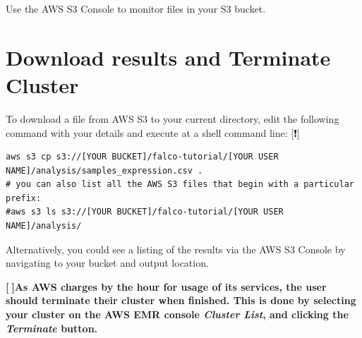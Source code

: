 \documentclass[
]{book}
\begin{document}
Use the AWS S3 Console to monitor files in your S3 bucket.

\hypertarget{download-results-and-terminate-cluster}{%
\section{Download results and Terminate Cluster}\label{download-results-and-terminate-cluster}}

To download a file from AWS S3 to your current directory, edit the following command with your details and execute at a shell command line: {[}❗️{]}

\begin{verbatim}
aws s3 cp s3://[YOUR BUCKET]/falco-tutorial/[YOUR USER NAME]/analysis/samples_expression.csv .
# you can also list all the AWS S3 files that begin with a particular prefix:
#aws s3 ls s3://[YOUR BUCKET]/falco-tutorial/[YOUR USER NAME]/analysis/
\end{verbatim}

Alternatively, you could see a listing of the results via the AWS S3 Console by navigating to your bucket and output location.

\textbf{{[}🔴{]}As AWS charges by the hour for usage of its services, the user should terminate their cluster when finished. This is done by selecting your cluster on the AWS EMR console \emph{Cluster List}, and clicking the \emph{Terminate} button.}

\backmatter
  
\end{document}
